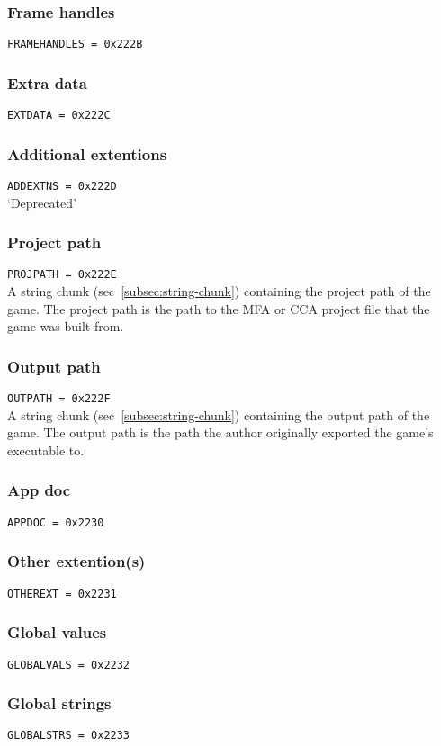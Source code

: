 \documentclass{article}
\begin{document}
\subsubsection{Frame handles}
\verb|FRAMEHANDLES = 0x222B|

\subsubsection{Extra data}
\verb|EXTDATA = 0x222C|

\subsubsection{Additional extentions}
\verb|ADDEXTNS = 0x222D|
\\
`Deprecated'

\subsubsection{Project path}
\verb|PROJPATH = 0x222E|
\\
A string chunk (sec~\ref{subsec:string-chunk}) containing the project path of
the game.
The project path is the path to the MFA or CCA project file that the game was
built from.

\subsubsection{Output path}
\verb|OUTPATH = 0x222F|
\\
A string chunk (sec~\ref{subsec:string-chunk}) containing the output path of
the game.
The output path is the path the author originally exported the game's
executable to.

\subsubsection{App doc}
\verb|APPDOC = 0x2230|

\subsubsection{Other extention(s)}
\verb|OTHEREXT = 0x2231|

\subsubsection{Global values}
\verb|GLOBALVALS = 0x2232|

\subsubsection{Global strings}
\verb|GLOBALSTRS = 0x2233|
\end{document}
